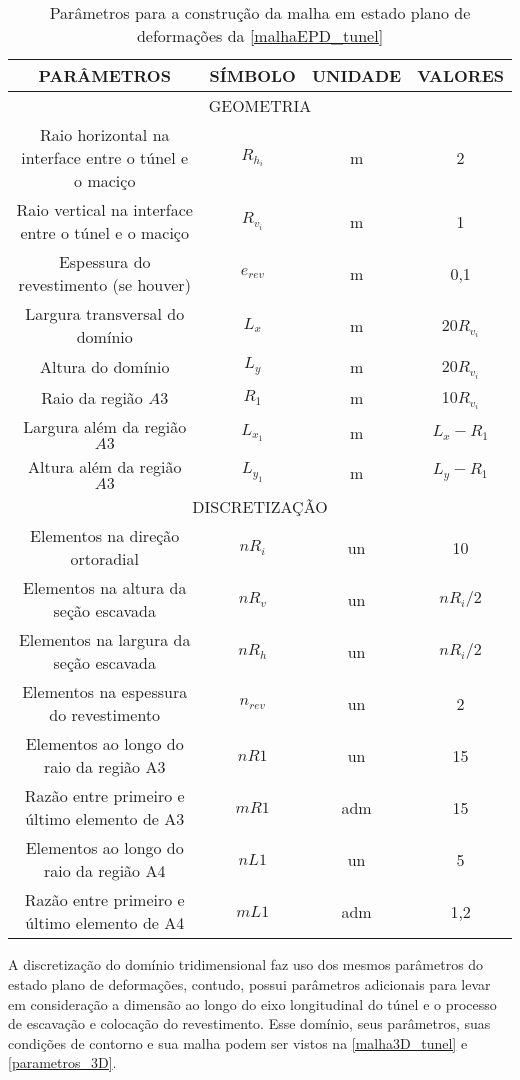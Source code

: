\begin{table}[H]
	\caption{Parâmetros para a construção da malha em estado plano de deformações da \autoref{malhaEPD_tunel}}
	\label{parametros_EPD}
	\centering
	\small
	\renewcommand{\arraystretch}{1.25}
	\begin{tabular}{c c c c}
		\hline
		\multicolumn{1}{c}{\textbf{PARÂMETROS}} &
		\multicolumn{1}{c}{\textbf{SÍMBOLO}} &
		\multicolumn{1}{c}{\textbf{UNIDADE}} &
		\multicolumn{1}{c}{\textbf{VALORES}} \\
		\hline
		\multicolumn{4}{c}{GEOMETRIA} \\
		\hline
		Raio horizontal na interface entre o túnel e o maciço & $R_{h_i}$ & m & 2 \\
		Raio vertical na interface entre o túnel e o maciço & $R_{v_i}$ & m & 1 \\
		Espessura do revestimento (se houver) & $e_{rev}$ & m & 0,1 \\
		Largura transversal do domínio & $L_x$ & m & 20$R_{v_i}$ \\
		Altura do domínio & $L_y$ & m & 20$R_{v_i}$ \\
		Raio da região $A3$ & $R_1$ & m & 10$R_{v_i}$ \\
		Largura além da região $A3$ & $L_{x_1}$ & m & $L_x-R_1$ \\
		Altura além da região $A3$ & $L_{y_1}$ & m & $L_y-R_1$ \\
		\hline
		\multicolumn{4}{c}{DISCRETIZAÇÃO} \\
		\hline
		Elementos na direção ortoradial & $nR_i$ & un & 10 \\
		Elementos na altura da seção escavada & $nR_{v}$ & un & $nR_i/2$ \\
		Elementos na largura da seção escavada & $nR_{h}$ & un & $nR_i/2$ \\
		Elementos na espessura do revestimento & $n_{rev}$ & un & 2 \\
		Elementos ao longo do raio da região A3 & $nR{1}$ & un & 15 \\
		Razão entre primeiro e último elemento de A3 & $mR{1}$ & adm & 15 \\
		Elementos ao longo do raio da região A4 & $nL{1}$ & un & 5 \\
		Razão entre primeiro e último elemento de A4 & $mL{1}$ & adm & 1,2 \\
		\hline
	\end{tabular}
	\normalsize
\end{table}

A discretização do domínio tridimensional faz uso dos mesmos parâmetros do estado plano de deformações, contudo, possui parâmetros adicionais para levar em consideração a dimensão ao longo do eixo longitudinal do túnel e o processo de escavação e colocação do revestimento. Esse domínio, seus parâmetros, suas condições de contorno e sua malha podem ser vistos na \autoref{malha3D_tunel} e \autoref{parametros_3D}.

